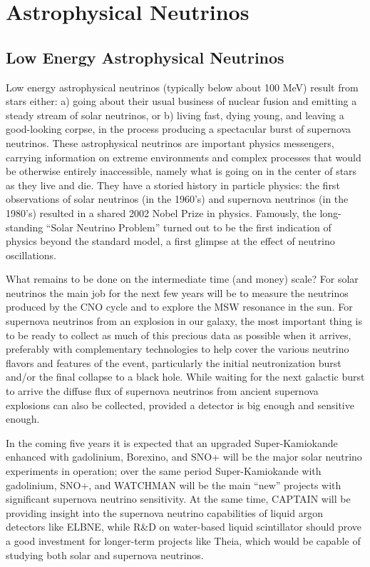 \section{Astrophysical Neutrinos}
\label{sec:Astrophysical}

\subsection{Low Energy Astrophysical Neutrinos}
\label{sec:Astrophysical_low}

Low energy astrophysical neutrinos (typically below about 100 MeV)
result from stars either: a) going about their usual business of
nuclear fusion and emitting a steady stream of solar neutrinos, or b)
living fast, dying young, and leaving a good-looking corpse, in the
process producing a spectacular burst of supernova neutrinos. These
astrophysical neutrinos are important physics messengers, carrying
information on extreme environments and complex processes that would
be otherwise entirely inaccessible, namely what is going on in the
center of stars as they live and die. They have a storied history in
particle physics: the first observations of solar neutrinos (in the
1960's) and supernova neutrinos (in the 1980's) resulted in a shared
2002 Nobel Prize in physics. Famously, the long-standing ``Solar
Neutrino Problem'' turned out to be the first indication of physics
beyond the standard model, a first glimpse at the effect of neutrino
oscillations.

What remains to be done on the intermediate time (and money) scale?
For solar neutrinos the main job for the next few years will be to
measure the neutrinos produced by the CNO cycle and to explore the MSW
resonance in the sun. For supernova neutrinos from an explosion in our
galaxy, the most important thing is to be ready to collect as much of
this precious data as possible when it arrives, preferably with
complementary technologies to help cover the various neutrino flavors
and features of the event, particularly the initial neutronization
burst and/or the final collapse to a black hole. While waiting for the
next galactic burst to arrive the diffuse flux of supernova neutrinos
from ancient supernova explosions can also be collected, provided a
detector is big enough and sensitive enough.

In the coming five years it is expected that an upgraded
Super-Kamiokande enhanced with gadolinium, Borexino, and SNO+ will be
the major solar neutrino experiments in operation; over the same
period Super-Kamiokande with gadolinium, SNO+, and WATCHMAN will be
the main ``new'' projects with significant supernova neutrino
sensitivity. At the same time, CAPTAIN will be providing insight into
the supernova neutrino capabilities of liquid argon detectors like
ELBNE, while R\&D on water-based liquid scintillator should prove a
good investment for longer-term projects like Theia, which would be
capable of studying both solar and supernova neutrinos.

